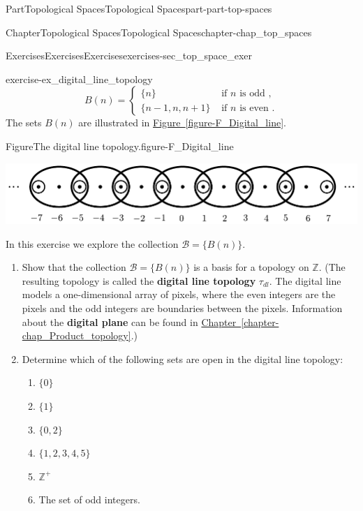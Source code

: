 \documentclass[oneside,10pt,]{book}
\newcommand{\xreffont}{\relax}
\newcommand{\terminology}[1]{\textbf{#1}}
\numberwithin{equation}{chapter}
\newcommand{\Z}{\mathbb{Z}}
\newcommand{\B}{\mathcal{B}}
\newcommand{\amp}{&}
\begin{document}
\begin{partptx}{Part}{Topological Spaces}{}{Topological Spaces}{}{}{part-part-top-spaces}
\begin{chapterptx}{Chapter}{Topological Spaces}{}{Topological Spaces}{}{}{chapter-chap_top_spaces}
\begin{exercises-section}{Exercises}{Exercises}{}{Exercises}{}{}{exercises-sec_top_space_exer}
\begin{divisionexercise}{11}{}{}{exercise-ex_digital_line_topology}
\begin{equation*}
B(n) = \begin{cases}\{n\}  \amp \text{ if \(n\) is odd } , \\ \{n-1,n,n+1\}  \amp \text{ if \(n\) is even } . \end{cases}
\end{equation*}
The sets \(B(n)\) are illustrated in \hyperref[figure-F_Digital_line]{Figure~{\xreffont\ref{figure-F_Digital_line}}}.%
\begin{figureptx}{Figure}{The digital line topology.}{figure-F_Digital_line}{}%
\begin{image}{0.05}{0.9}{0.05}{}%
\includegraphics[width=\linewidth]{external/Digital_line.pdf}
\end{image}%
\tcblower
\end{figureptx}%
In this exercise we explore the collection \(\B = \{B(n)\}\).%
\begin{enumerate}[font=\bfseries,label=(\alph*),ref=\alph*]%
\item{}Show that the collection \(\B = \{B(n)\}\) is a basis for a topology on \(\Z\). (The resulting topology is called the \terminology{digital line topology} \(\tau_{dl}\).\footnotemark{} The digital line models a one-dimensional array of pixels, where the even integers are the pixels and the odd integers are boundaries between the pixels. Information about the \terminology{digital plane} can be found in \hyperref[chapter-chap_Product_topology]{Chapter~{\xreffont\ref{chapter-chap_Product_topology}}}.)%
\item{}Determine which of the following sets are open in the digital line topology:%
\begin{enumerate}[font=\bfseries,label=(\roman*),ref=\theenumi.\roman*]%
\item{}\(\{0\}\)%
\item{}\(\{1\}\)%
\item{}\(\{0, 2\}\)%
\item{}\(\{1, 2, 3, 4, 5\}\)%
\item{}\(\Z^+\)%
\item{}The set of odd integers.%
\end{enumerate}%
\end{enumerate}%
\end{divisionexercise}%

\end{exercises-section}
\end{chapterptx}
\end{partptx}
\end{document}

